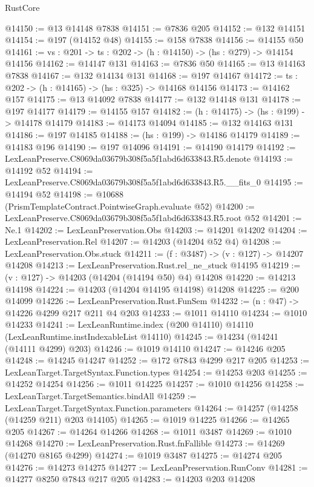 \begin{lexlean}{RustCore}
\begin{coremodule}
@14150 := @13 @14148 @7838
@14151 := @7836 @205
@14152 := @132 @14151
@14154 := @197 (@14152 @48)
@14155 := @158 @7838
@14156 := @14155 @50
@14161 := {vs : @201} -> {ts : @202} -> (h : @14150) -> (hs : @279) -> @14154 @14156
@14162 := @14147 @131
@14163 := @7836 @50
@14165 := @13 @14163 @7838
@14167 := @132 @14134 @131
@14168 := @197 @14167
@14172 := {ts : @202} -> (h : @14165) -> (hs : @325) -> @14168 @14156
@14173 := @14162 @157
@14175 := @13 @14092 @7838
@14177 := @132 @14148 @131
@14178 := @197 @14177
@14179 := @14155 @157
@14182 := (h : @14175) -> (hs : @199) -> @14178 @14179
@14183 := @14173 @14094
@14185 := @132 @14163 @131
@14186 := @197 @14185
@14188 := (hs : @199) -> @14186 @14179
@14189 := @14183 @196
@14190 := @197 @14096
@14191 := @14190 @14179
@14192 := LexLeanPreserve.C8069da03679b308f5a5f1abd6d633843.R5.denote
@14193 := @14192 @52
@14194 := LexLeanPreserve.C8069da03679b308f5a5f1abd6d633843.R5.__fits_0
@14195 := @14194 @52
@14198 := @10688 (PrismTemplateContract.PointwiseGraph.evaluate @52)
@14200 := LexLeanPreserve.C8069da03679b308f5a5f1abd6d633843.R5.root @52
@14201 := Ne.{1}
@14202 := LexLeanPreservation.Obs
@14203 := @14201 @14202
@14204 := LexLeanPreservation.Rel
@14207 := @14203 (@14204 @52 @4)
@14208 := LexLeanPreservation.Obs.stuck
@14211 := (f : @3487) -> (v : @127) -> @14207 @14208
@14213 := LexLeanPreservation.Rust.rel_ne_stuck @14195
@14219 := (v : @127) -> @14203 (@14204 (@14194 @50) @4) @14208
@14220 := @14213 @14198
@14224 := @14203 (@14204 @14195 @14198) @14208
@14225 := @200 @14099
@14226 := LexLeanPreservation.Rust.FunSem
@14232 := (n : @47) -> @14226 @4299 @217 @211 @4 @203
@14233 := @1011 @14110
@14234 := @1010 @14233
@14241 := LexLeanRuntime.index (@200 @14110) @14110 (LexLeanRuntime.instIndexableList @14110)
@14245 := @14234 (@14241 (@14111 @4299) @203)
@14246 := @1019 @14110
@14247 := @14246 @205
@14248 := @14245 @14247
@14252 := @172 @7843 @4299 @217 @205
@14253 := LexLeanTarget.TargetSyntax.Function.types
@14254 := @14253 @203
@14255 := @14252 @14254
@14256 := @1011 @14225
@14257 := @1010 @14256
@14258 := LexLeanTarget.TargetSemantics.bindAll
@14259 := LexLeanTarget.TargetSyntax.Function.parameters
@14264 := @14257 (@14258 (@14259 @211) @203 @14105)
@14265 := @1019 @14225
@14266 := @14265 @205
@14267 := @14264 @14266
@14268 := @1011 @3487
@14269 := @1010 @14268
@14270 := LexLeanPreservation.Rust.fnFallible
@14273 := @14269 (@14270 @8165 @4299)
@14274 := @1019 @3487
@14275 := @14274 @205
@14276 := @14273 @14275
@14277 := LexLeanPreservation.RunConv
@14281 := @14277 @8250 @7843 @217 @205
@14283 := @14203 @203 @14208

\end{coremodule}
\end{lexlean}
